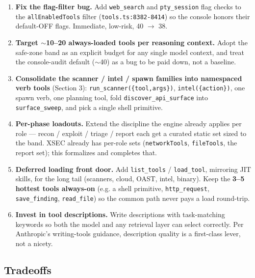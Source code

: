 \documentclass[11pt]{article}
\begin{document}
\begin{enumerate}[leftmargin=*]
  \item \textbf{Fix the flag-filter bug.} Add \texttt{web\_search} and
  \texttt{pty\_session} flag checks to the \texttt{allEnabledTools} filter
  (\texttt{tools.ts:8382-8414}) so the console honors their default-OFF flags.
  Immediate, low-risk, 40 $\rightarrow$ 38.
  \item \textbf{Target $\sim$10--20 always-loaded tools per reasoning context.}
  Adopt the safe-zone band as an explicit budget for any single model context,
  and treat the console-audit default ($\sim$40) as a bug to be paid down, not a
  baseline.
  \item \textbf{Consolidate the scanner / intel / spawn families into namespaced
  verb tools} (Section 3): \texttt{run\_scanner(\{tool,args\})},
  \texttt{intel(\{action\})}, one spawn verb, one planning tool, fold
  \texttt{discover\_api\_surface} into \texttt{surface\_sweep}, and pick a single
  shell primitive.
  \item \textbf{Per-phase loadouts.} Extend the discipline the engine already
  applies per role --- recon / exploit / triage / report each get a curated
  static set sized to the band. XSEC already has per-role sets
  (\texttt{networkTools}, \texttt{fileTools}, the report set); this formalizes and
  completes that.
  \item \textbf{Deferred loading front door.} Add \texttt{list\_tools} /
  \texttt{load\_tool}, mirroring JIT skills, for the long tail (scanners, cloud,
  OAST, intel, binary). Keep the \textbf{3--5 hottest tools always-on} (e.g. a
  shell primitive, \texttt{http\_request}, \texttt{save\_finding},
  \texttt{read\_file}) so the common path never pays a load round-trip.
  \item \textbf{Invest in tool descriptions.} Write descriptions with
  task-matching keywords so both the model and any retrieval layer can select
  correctly. Per Anthropic's writing-tools guidance, description quality is a
  first-class lever, not a nicety.
\end{enumerate}

\subsection{Tradeoffs}
\end{document}

